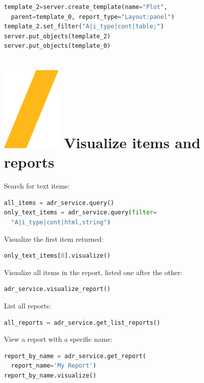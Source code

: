 \documentclass[9pt,landscape]{article}
\begin{document}
\begin{multicols}{3}
\begin{lstlisting}[language=Python]
template_2=server.create_template(name="Plot", 
  parent=template_0, report_type="Layout:panel")
template_2.set_filter("A|i_type|cont|table;")
server.put_objects(template_2)
server.put_objects(template_0)
\end{lstlisting}

\section{\includegraphics[height=\fontcharht\font`\S]{slash.png}  Visualize items and reports}
Search for text items:
\begin{lstlisting}[language=Python]
all_items = adr_service.query()
only_text_items = adr_service.query(filter=
  "A|i_type|cont|html,string")
\end{lstlisting}
Visualize the first item returned:
\begin{lstlisting}[language=Python]
only_text_items[0].visualize()
\end{lstlisting}

Visualize all items in the report, listed one after the other:
\begin{lstlisting}[language=Python]
adr_service.visualize_report()
\end{lstlisting}
List all reports:
\begin{lstlisting}[language=Python]
all_reports = adr_service.get_list_reports()
\end{lstlisting}
View a report with a specific name:
\begin{lstlisting}[language=Python]
report_by_name = adr_service.get_report(
  report_name='My Report')
report_by_name.visualize()
\end{lstlisting}



\end{multicols}
\end{document}
